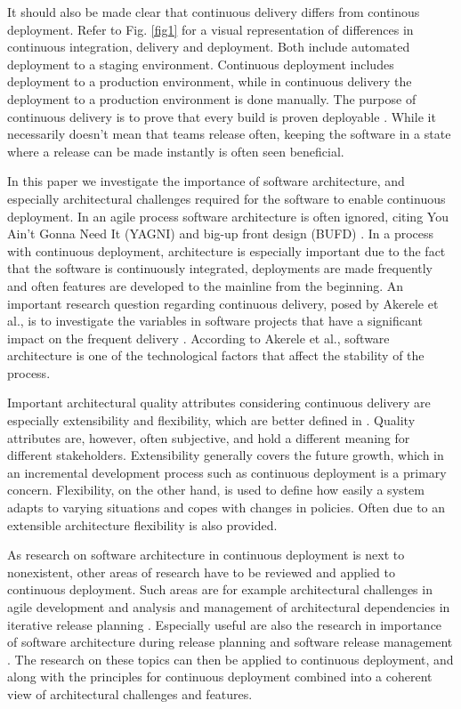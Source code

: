 \documentclass[conference]{IEEEtran}
\begin{document}
It should also be made clear that continuous delivery differs from continous deployment. Refer to Fig. \ref{fig1} for a visual representation of differences in continuous integration, delivery and deployment. Both include automated deployment to a staging environment. Continuous deployment includes deployment to a production environment, while in continuous delivery the deployment to a production environment is done manually. The purpose of continuous delivery is to prove that every build is proven deployable \cite{cdbook}. While it necessarily doesn't mean that teams release often, keeping the software in a state where a release can be made instantly is often seen beneficial.

In this paper we investigate the importance of software architecture, and especially architectural challenges required for the software to enable continuous deployment. In an agile process software architecture is often ignored, citing You Ain't Gonna Need It (YAGNI) and big-up front design (BUFD) \cite{kruchten2010software}. In a process with continuous deployment, architecture is especially important due to the fact that the software is continuously integrated, deployments are made frequently and often features are developed to the mainline from the beginning. An important research question regarding continuous delivery, posed by Akerele et al., is to investigate the variables in software projects that have a significant impact on the frequent delivery \cite{6612879}. According to Akerele et al., software architecture is one of the technological factors that affect the stability of the process. 

Important architectural quality attributes considering continuous delivery are especially extensibility and flexibility, which are better defined in \cite{kaisler2005software}. Quality attributes are, however, often subjective, and hold a different meaning for different stakeholders. Extensibility generally covers the future growth, which in an incremental development process such as continuous deployment is a primary concern. Flexibility, on the other hand, is used to define how easily a system adapts to varying situations and copes with changes in policies. Often due to an extensible architecture flexibility is also provided. 

As research on software architecture in continuous deployment is next to nonexistent, other areas of research have to be reviewed and applied to continuous deployment. Such areas are for example architectural challenges in agile development \cite{kruchten2010software} and analysis and management of architectural dependencies in iterative release planning \cite{brown2011analysis}. Especially useful are also the research in importance of software architecture during release planning \cite{lindgren2008importance} and software release management \cite{van1997software}. The research on these topics can then be applied to continuous deployment, and along with the principles for continuous deployment \cite{humble2006deployment} combined into a coherent view of architectural challenges and features. 
\end{document}
